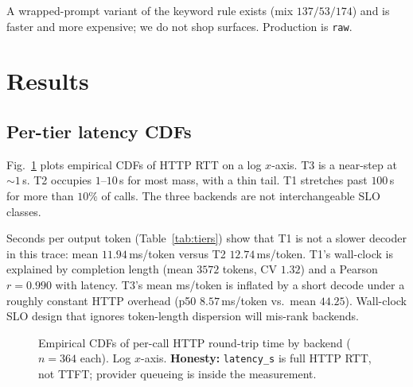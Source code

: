 \documentclass[10pt,conference]{IEEEtran}
\begin{document}
A wrapped-prompt variant of the keyword rule exists (mix $137/53/174$) and is faster and more expensive; we do not shop surfaces. Production is \texttt{raw}.

\section{Results}
\label{sec:results}

\subsection{Per-tier latency CDFs}
Fig.~\ref{fig:cdf} plots empirical CDFs of HTTP RTT on a log $x$-axis. T3 is a near-step at ${\sim}1$\,s. T2 occupies $1$--$10$\,s for most mass, with a thin tail. T1 stretches past $100$\,s for more than $10\%$ of calls. The three backends are not interchangeable SLO classes.

Seconds per output token (Table~\ref{tab:tiers}) show that T1 is not a slower decoder in this trace: mean $11.94$\,ms/token versus T2 $12.74$\,ms/token. T1's wall-clock is explained by completion length (mean $3572$ tokens, CV $1.32$) and a Pearson $r{=}0.990$ with latency. T3's mean ms/token is inflated by a short decode under a roughly constant HTTP overhead (p50 $8.57$\,ms/token vs.\ mean $44.25$). Wall-clock SLO design that ignores token-length dispersion will mis-rank backends.

\begin{figure}[t]
\centering
{}
\caption{Empirical CDFs of per-call HTTP round-trip time by backend ($n{=}364$ each). Log $x$-axis. \textbf{Honesty:} \texttt{latency\_s} is full HTTP RTT, not TTFT; provider queueing is inside the measurement.}
\label{fig:cdf}
\end{figure}
\end{document}
